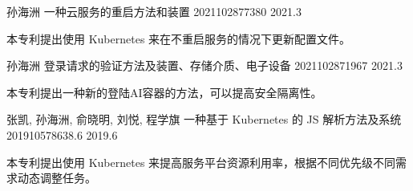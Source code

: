 
\begin{cventries}



\cventry
{孙海洲} %
{一种云服务的重启方法和装置} %
{2021102877380} %
{2021.3} %
{
  \begin{cvitems} %
    \item {
      本专利提出使用 Kubernetes 来在不重启服务的情况下更新配置文件。
    }
  \end{cvitems}
}

  \cventry
    {孙海洲} %
    {登录请求的验证方法及装置、存储介质、电子设备} %
    {2021102871967} %
    {2021.3} %
    {
      \begin{cvitems} %
        \item {
          本专利提出一种新的登陆AI容器的方法，可以提高安全隔离性。
        }
      \end{cvitems}
    }

\cventry
{张凯, 孙海洲, 俞晓明, 刘悦, 程学旗} %
{一种基于 Kubernetes 的 JS 解析方法及系统} %
{201910578638.6} %
{2019.6} %
{
  \begin{cvitems} %
    \item {
      本专利提出使用 Kubernetes 来提高服务平台资源利用率，根据不同优先级不同需求动态调整任务。
    }
  \end{cvitems}
}

\end{cventries}
